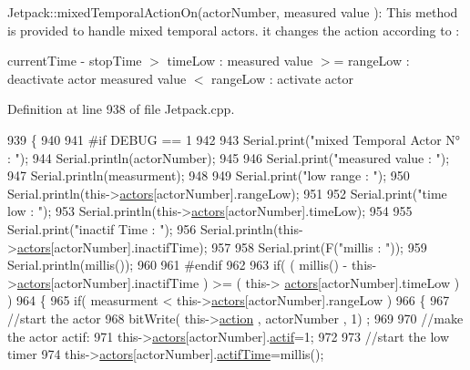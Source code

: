 Jetpack\+::mixed\+Temporal\+Action\+On(actor\+Number, measured value )\+: This method is provided to handle mixed temporal actors. it changes the action according to \+:

current\+Time -\/ stop\+Time $>$ time\+Low \+: measured value $>$= range\+Low \+: deactivate actor measured value $<$ range\+Low \+: activate actor 

Definition at line 938 of file Jetpack.\+cpp.


\begin{DoxyCode}
939 \{
940 
941 \textcolor{preprocessor}{#if DEBUG == 1}
942     
943     Serial.print(\textcolor{stringliteral}{"mixed Temporal Actor N° : "});
944     Serial.println(actorNumber);
945 
946     Serial.print(\textcolor{stringliteral}{"measured value : "});
947     Serial.println(measurment);
948 
949     Serial.print(\textcolor{stringliteral}{"low range : "});
950     Serial.println(this->\hyperlink{class_jetpack_a7e16d2f97837f9712a2e6de1c50d99db}{actors}[actorNumber].rangeLow);
951 
952     Serial.print(\textcolor{stringliteral}{"time low : "});
953     Serial.println(this->\hyperlink{class_jetpack_a7e16d2f97837f9712a2e6de1c50d99db}{actors}[actorNumber].timeLow);
954 
955     Serial.print(\textcolor{stringliteral}{"inactif Time : "});
956     Serial.println(this->\hyperlink{class_jetpack_a7e16d2f97837f9712a2e6de1c50d99db}{actors}[actorNumber].inactifTime);
957 
958     Serial.print(F(\textcolor{stringliteral}{"millis : "}));
959     Serial.println(millis());
960 
961 \textcolor{preprocessor}{#endif}
962 
963     \textcolor{keywordflow}{if}( ( millis() - this->\hyperlink{class_jetpack_a7e16d2f97837f9712a2e6de1c50d99db}{actors}[actorNumber].inactifTime ) >= (  this->
      \hyperlink{class_jetpack_a7e16d2f97837f9712a2e6de1c50d99db}{actors}[actorNumber].timeLow  ) )
964     \{
965         \textcolor{keywordflow}{if}( measurment < this->\hyperlink{class_jetpack_a7e16d2f97837f9712a2e6de1c50d99db}{actors}[actorNumber].rangeLow )
966         \{
967             \textcolor{comment}{//start the actor}
968             bitWrite( this->\hyperlink{class_jetpack_aca3142925a7b0834b34ae91d26af7765}{action} , actorNumber , 1) ;
969 
970             \textcolor{comment}{//make the actor actif:}
971             this->\hyperlink{class_jetpack_a7e16d2f97837f9712a2e6de1c50d99db}{actors}[actorNumber].\hyperlink{struct_jetpack_1_1state_aa177541689bbaea21a4650a083b0df77}{actif}=1;
972 
973             \textcolor{comment}{//start the low timer}
974             this->\hyperlink{class_jetpack_a7e16d2f97837f9712a2e6de1c50d99db}{actors}[actorNumber].\hyperlink{struct_jetpack_1_1state_af2e1cc323ef9ffcc3cf4d203f85d726b}{actifTime}=millis();

\end{DoxyCode}
